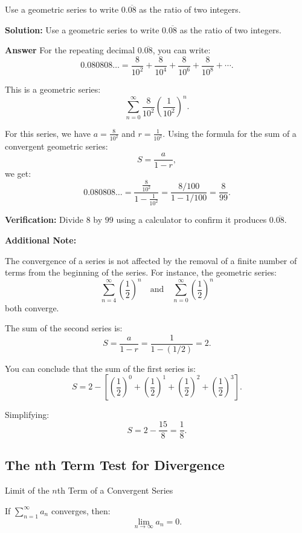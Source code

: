 \documentclass[12pt]{article}
\theoremstyle{beautifulthm}
\begin{document}
\begin{tcolorbox}[colback=examplebg, colframe=red!75!black, title=\textbf{EXAMPLE 2:  Geometric Series for a Repeating Decimal}, fonttitle=\bfseries, sharp corners]

Use a geometric series to write $0.\overline{08}$ as the ratio of two integers.

\tcblower
\textbf{Solution:} 
Use a geometric series to write $0.\overline{08}$ as the ratio of two integers.

\textbf{Answer}
For the repeating decimal $0.\overline{08}$, you can write:
\[
0.080808\ldots = \frac{8}{10^2} + \frac{8}{10^4} + \frac{8}{10^6} + \frac{8}{10^8} + \cdots.
\]

This is a geometric series:
\[
\sum_{n=0}^\infty \frac{8}{10^2} \left(\frac{1}{10^2}\right)^n.
\]

For this series, we have $a = \frac{8}{10^2}$ and $r = \frac{1}{10^2}$. Using the formula for the sum of a convergent geometric series:
\[
S = \frac{a}{1 - r},
\]
we get:
\[
0.080808\ldots = \frac{\frac{8}{10^2}}{1 - \frac{1}{10^2}} = \frac{8/100}{1 - 1/100} = \frac{8}{99}.
\]

\textbf{Verification:} Divide $8$ by $99$ using a calculator to confirm it produces $0.\overline{08}$.

\textbf{Additional Note:}

The convergence of a series is not affected by the removal of a finite number of terms from the beginning of the series. For instance, the geometric series:
\[
\sum_{n=4}^\infty \left(\frac{1}{2}\right)^n \quad \text{and} \quad \sum_{n=0}^\infty \left(\frac{1}{2}\right)^n
\]
both converge. 

The sum of the second series is:
\[
S = \frac{a}{1 - r} = \frac{1}{1 - (1/2)} = 2.
\]

You can conclude that the sum of the first series is:
\[
S = 2 - \left[\left(\frac{1}{2}\right)^0 + \left(\frac{1}{2}\right)^1 + \left(\frac{1}{2}\right)^2 + \left(\frac{1}{2}\right)^3\right].
\]

Simplifying:
\[
S = 2 - \frac{15}{8} = \frac{1}{8}.
\]
\end{tcolorbox}

\newpage
\subsection{The nth Term Test
for Divergence}
\begin{mytheorem}{Limit of the $n$th Term of a Convergent Series}{}

    If $\sum_{n=1}^\infty a_n$ converges, then:
\[
\lim_{n \to \infty} a_n = 0.
\]
\end{mytheorem}
\end{document}
